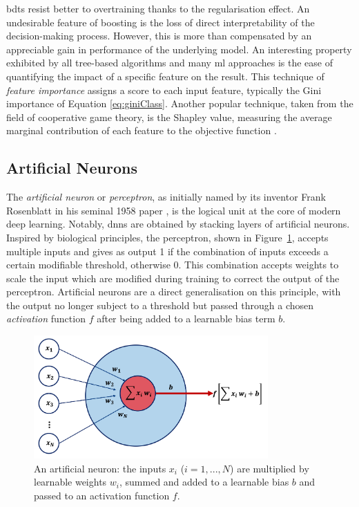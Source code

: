 \glspl{bdt} resist better to overtraining thanks to the regularisation effect. An undesirable feature of boosting is the loss of direct interpretability of the decision-making process. However, this is more than compensated by an appreciable gain in performance of the underlying model. An interesting property exhibited by all tree-based algorithms and many \gls{ml} approaches is the ease of quantifying the impact of a specific feature on the result. This technique of \textit{feature importance} assigns a score to each input feature, typically the Gini importance of Equation \ref{eq:giniClass}. Another popular technique, taken from the field of cooperative game theory, is the Shapley value, measuring the average marginal contribution of each feature to the objective function \cite{shapley:book1952, Rozemberczki2022TheSV}.


\subsection{Artificial Neurons}
The \textit{artificial neuron} or \textit{perceptron}, as initially named by its inventor Frank Rosenblatt in his seminal 1958 paper \cite{rosenblatt1958perceptron}, is the logical unit at the core of modern deep learning. Notably, \glspl{dnn} are obtained by stacking layers of artificial neurons. Inspired by biological principles, the perceptron, shown in Figure~\ref{fig:annModel}, accepts multiple inputs and gives as output 1 if the combination of inputs exceeds a certain modifiable threshold, otherwise 0. This combination accepts weights to scale the input which are modified during training to correct the output of the perceptron. Artificial neurons are a direct generalisation on this principle, with the output no longer subject to a threshold but passed through a chosen \textit{activation} function $f$ after being added to a learnable bias term $b$. 

\begin{figure}[h!]
    \center
    \includegraphics[width=0.8\textwidth]{Images/ML/ann.png}
    \caption{An artificial neuron: the inputs $x_i$ ($i= 1, ..., N$) are multiplied by learnable weights $w_i$, summed and added to a learnable bias $b$ and passed to an activation function $f$.} 
    \label{fig:annModel}
\end{figure}

